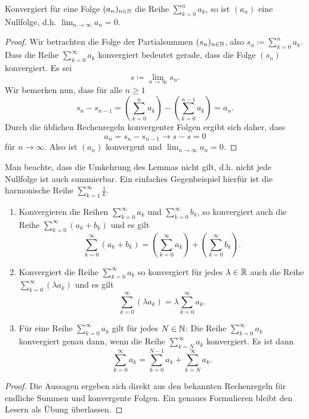 \documentclass[a4paper,10pt]{article}
\begin{document}
\begin{lem}\label{lem: Reihe bedeutet Nullfolge}
 Konvergiert für eine Folge $(a_n)_{n \in \mathbb{N}}$ die Reihe $\sum_{k=0}^n a_k$, so ist $(a_n)$ eine Nullfolge, d.h. $\lim_{n \to \infty} a_n = 0$.
\end{lem}
\begin{proof}
 Wir betrachten die Folge der Partialsummen $(s_n)_{n \in \mathbb{N}}$, also $s_n \coloneqq \sum_{k=0}^n a_k$. Dass die Reihe $\sum_{k=0}^\infty a_k$ konvergiert bedeutet gerade, dass die Folge $(s_n)$ konvergiert. Es sei
 \[
  s \coloneqq \lim_{n \to \infty} s_n.
 \]
 Wir bemerken nun, dass für alle $n \geq 1$
 \[
  s_n - s_{n-1}
  = \left( \sum_{k=0}^n a_k \right) - \left( \sum_{k=0}^{n-1} a_k \right)
  = a_n.
 \]
 Durch die üblichen Rechenregeln konvergenter Folgen ergibt sich daher, dass
 \[
  a_n = s_n - s_{n-1} \to s-s = 0
 \]
 für $n \to \infty$. Also ist $(a_n)$ konvergent und $\lim_{n \to \infty} a_n = 0$.
\end{proof}


Man beachte, dass die Umkehrung des Lemmas nicht gilt, d.h. nicht jede Nullfolge ist auch summierbar. Ein einfaches Gegenbeispiel hierfür ist die harmonische Reihe $\sum_{k=1}^\infty \frac{1}{k}$.


\begin{prop}
 \begin{enumerate}
  \item
   Konvergieren die Reihen $\sum_{k=0}^\infty a_k$ und $\sum_{k=0}^\infty b_k$, so konvergiert auch die Reihe $\sum_{k=0}^\infty (a_k + b_k)$ und es gilt
   \[
    \sum_{k=0}^\infty (a_k + b_k) = \left( \sum_{k=0}^\infty a_k \right) + \left( \sum_{k=0}^\infty b_k \right).
   \]
  \item
   Konvergiert die Reihe $\sum_{k=0}^\infty a_k$ so konvergiert für jedes $\lambda \in \mathbb{R}$ auch die Reihe $\sum_{k=0}^\infty (\lambda a_k)$ und es gilt
   \[
    \sum_{k=0}^\infty (\lambda a_k) = \lambda \sum_{k=0}^\infty a_k.
   \]
  \item
   Für eine Reihe $\sum_{k=0}^\infty a_k$ gilt für jedes $N \in \mathbb{N}$: Die Reihe $\sum_{k=0}^\infty a_k$ konvergiert genau dann, wenn die Reihe $\sum_{k=N}^\infty a_k$ konvergiert. Es ist dann
   \[
    \sum_{k=0}^\infty a_k = \sum_{k=0}^{N-1} a_k + \sum_{k=N}^\infty a_k.
   \]
 \end{enumerate}
\end{prop}
\begin{proof}
 Die Aussagen ergeben sich direkt aus den bekannten Rechenregeln für endliche Summen und konvergente Folgen. Ein genaues Formulieren bleibt den Lesern als Übung überlassen.
\end{proof}
\end{document}
